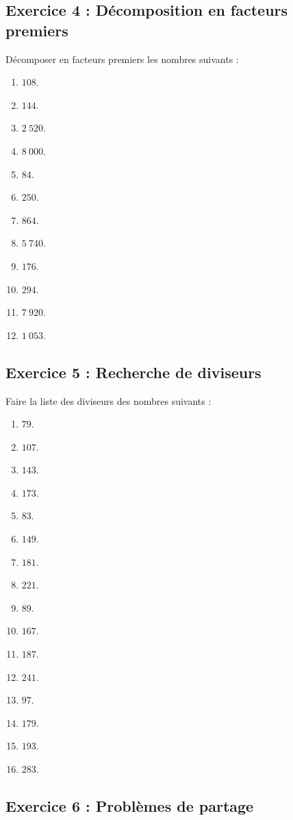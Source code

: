 \documentclass[14 pt]{extarticle}
\theoremstyle{plain}
\begin{document}
  \subsection*{Exercice 4 : Décomposition en facteurs premiers}
  Décomposer en facteurs premiers les nombres suivants : 
  \begin{enumerate}
  
 \item $108$. 
 \item $144$. 
 \item $2~520$. 
 \item $8~000$. 
 \item $84$. 
 \item $250$. 
 \item $864$. 
 \item $5~740$. 
 \item $176$.
 \item $294$. 
 \item $7~920$. 
 \item $1~053$. 
  \end{enumerate}
  
  \subsection*{Exercice 5 : Recherche de diviseurs }
  
  Faire la liste des diviseurs des nombres suivants : 
  
   \begin{enumerate}
 \item $79$. 
 \item $107$. 
 \item $143$. 
 \item $173$. 
 \item $83$. 
 \item $149$. 
 \item $181$. 
 \item $221$. 
 \item $89$. 
 \item $167$. 
 \item $187$. 
 \item $241$. 
 \item $97$. 
 \item $179$. 
 \item $193$. 
 \item  $283$. 
 \end{enumerate}
  
  \subsection*{Exercice 6 : Problèmes de partage}
  
\end{document}
